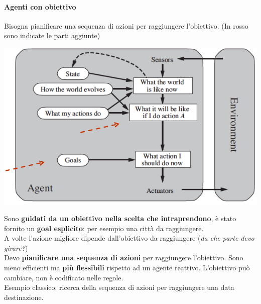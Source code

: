 \documentclass[10pt]{book}
\begin{document}
\paragraph{Agenti con obiettivo} Bisogna pianificare una sequenza di azioni per raggiungere l'obiettivo. (In rosso sono indicate le parti aggiunte)
\begin{center}
	\includegraphics[scale=0.5]{agobiettivo.png}
\end{center}
Sono \textbf{guidati da un obiettivo nella scelta che intraprendono}, è stato fornito un \textbf{goal esplicito}: per esempio una città da raggiungere.\\
A volte l'azione migliore dipende dall'obiettivo da raggiungere (\textit{da che parte devo girare?})\\
Devo \textbf{pianificare una sequenza di azioni} per raggiungere l'obiettivo. Sono meno efficienti ma \textbf{più flessibili} rispetto ad un agente reattivo. L'obiettivo può cambiare, non è codificato nelle regole.\\
Esempio classico: ricerca della sequenza di azioni per raggiungere una data destinazione.
\end{document}
